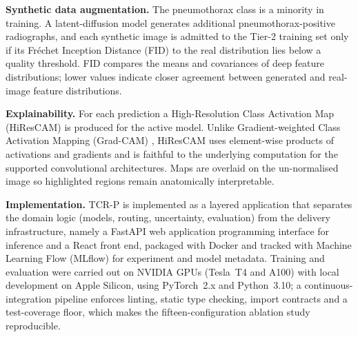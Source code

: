 \documentclass[pdflatex,sn-nature]{sn-jnl}
\begin{document}
\textbf{Synthetic data augmentation.} The pneumothorax class is a minority in training. A latent-diffusion model \cite{rombach2022high} generates additional pneumothorax-positive radiographs, and each synthetic image is admitted to the Tier-2 training set only if its Fr\'echet Inception Distance (FID) to the real distribution lies below a quality threshold. FID compares the means and covariances of deep feature distributions; lower values indicate closer agreement between generated and real-image feature distributions.

\textbf{Explainability.} For each prediction a High-Resolution Class Activation Map (HiResCAM) \cite{draelos2020hirescam} is produced for the active model. Unlike Gradient-weighted Class Activation Mapping (Grad-CAM) \cite{selvaraju2017gradcam}, HiResCAM uses element-wise products of activations and gradients and is faithful to the underlying computation for the supported convolutional architectures. Maps are overlaid on the un-normalised image so highlighted regions remain anatomically interpretable.

\textbf{Implementation.} TCR-P is implemented as a layered application that separates the domain logic (models, routing, uncertainty, evaluation) from the delivery infrastructure, namely a FastAPI web application programming interface for inference and a React front end, packaged with Docker and tracked with Machine Learning Flow (MLflow) for experiment and model metadata. Training and evaluation were carried out on NVIDIA GPUs (Tesla~T4 and A100) with local development on Apple Silicon, using PyTorch~2.x and Python~3.10; a continuous-integration pipeline enforces linting, static type checking, import contracts and a test-coverage floor, which makes the fifteen-configuration ablation study reproducible.
\end{document}
